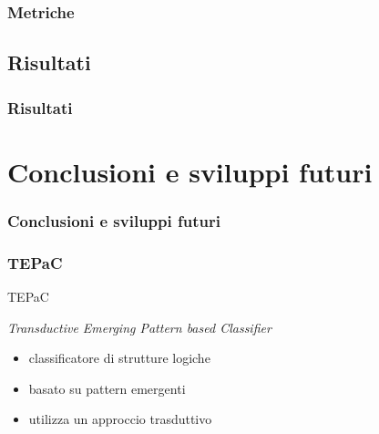 \documentclass{beamer}
\begin{document}

\begin{frame}
\frametitle{Metriche}
\end{frame}


\subsection{Risultati}


\begin{frame}
\frametitle{Risultati}
\end{frame}


\section{Conclusioni e sviluppi futuri}
\begin{frame}
\frametitle{Conclusioni e sviluppi futuri}
\end{frame}


\begin{frame}
\frametitle{TEPaC}
TEPaC

\emph{Transductive Emerging Pattern based Classifier}

\begin{itemize}
\item classificatore di strutture logiche
\item basato su pattern emergenti
\item utilizza un approccio trasduttivo
\end{itemize}

\end{frame}

\end{document}
